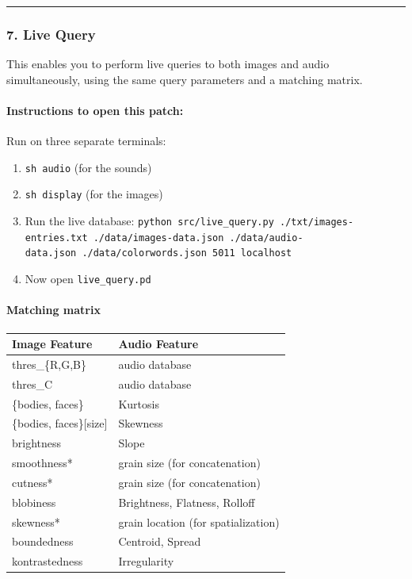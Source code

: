 \begin{center}\rule{0.5\linewidth}{\linethickness}\end{center}

\hypertarget{live-query}{%
\subsubsection{7. Live Query}\label{live-query}}

This enables you to perform live queries to both images and audio simultaneously, using the same query parameters and a matching matrix.

\hypertarget{instructions-to-open-this-patch}{%
\paragraph{Instructions to open this patch:}\label{instructions-to-open-this-patch}}

Run on three separate terminals:

\begin{enumerate}
\def\labelenumi{\arabic{enumi}.}
\tightlist
\item
  \texttt{sh\ audio} (for the sounds)
\item
  \texttt{sh\ display} (for the images)
\item
  Run the live database: \texttt{python\ src/live\_query.py\ ./txt/images-entries.txt\ ./data/images-data.json\ ./data/audio-data.json\ ./data/colorwords.json\ 5011\ localhost}
\item
  Now open \texttt{live\_query.pd}
\end{enumerate}

\hypertarget{matching-matrix}{%
\paragraph{Matching matrix}\label{matching-matrix}}

\begin{longtable}[]{@{}ll@{}}
\toprule
Image Feature & Audio Feature\tabularnewline
\midrule
\endhead
thres\_\{R,G,B\} & audio database\tabularnewline
thres\_C & audio database\tabularnewline
\{bodies, faces\} & Kurtosis\tabularnewline
\{bodies, faces\}{[}size{]} & Skewness\tabularnewline
brightness & Slope\tabularnewline
smoothness* & grain size (for concatenation)\tabularnewline
cutness* & grain size (for concatenation)\tabularnewline
blobiness & Brightness, Flatness, Rolloff\tabularnewline
skewness* & grain location (for spatialization)\tabularnewline
boundedness & Centroid, Spread\tabularnewline
kontrastedness & Irregularity\tabularnewline
\bottomrule
\end{longtable}

